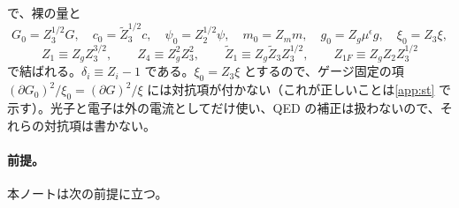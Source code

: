 \documentclass[a4paper,10pt]{ltjsarticle}
\begin{document}
で、裸の量と
\begin{equation*}
G_0=Z_3^{1/2}G,\quad c_0=\tilde Z_3^{1/2}c,\quad \psi_0=Z_2^{1/2}\psi,\quad m_0=Z_mm,\quad g_0=Z_g\mu^\epsilon g,\quad \xi_0=Z_3\xi,
\end{equation*}
\begin{equation*}
Z_1\equiv Z_gZ_3^{3/2},\qquad Z_4\equiv Z_g^2Z_3^2,\qquad \tilde Z_1\equiv Z_g\tilde Z_3Z_3^{1/2},\qquad Z_{1F}\equiv Z_gZ_2Z_3^{1/2}
\end{equation*}
で結ばれる。$\delta_i\equiv Z_i-1$ である。$\xi_0=Z_3\xi$ とするので、ゲージ固定の項 $(\partial G_0)^2/\xi_0=(\partial G)^2/\xi$ には対抗項が付かない（これが正しいことは\ref{app:st} で示す）。光子と電子は外の電流としてだけ使い、QED の補正は扱わないので、それらの対抗項は書かない。

\paragraph{前提。}本ノートは次の前提に立つ。
\end{document}
